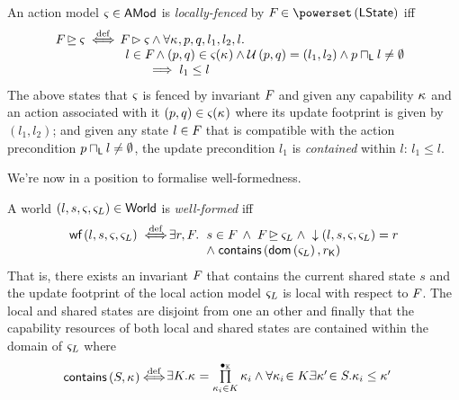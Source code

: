\begin{definition}
An action model $\varsigma_{} \in \textsf{AMod}$ is \emph{locally-fenced} by $\fence{} \in \pset{\LStates}$ iff
%
\[
\hspace*{-0.2cm}
\begin{array}{l l}
	\fence{} \strictfences \amod{} \iffdef 
	&
		\hspace*{-0.3cm}
		\fence{} \fences \amod{} \land
		\for{\ca{}, p, q, l_1, l_2, l}\\
	&
		\hspace*{-0.15cm}
		l \in \fence{} \land 
		(p, q) \in \amod{}(\ca{}) \land 
		\updateFP{p, q} = (l_1, l_2) \land 
		p \meetL l \not= \emptyset\\
	&
		\hspace*{0.5cm}
		\implies
		l_1 \leq l
\end{array}
\]
%
The above states that $\varsigma_{}$ is fenced by invariant $F_{}$ and given any capability $\kappa_{}$ and an action associated with it $(p, q) \in \varsigma_{}(\kappa_{})$ where its update footprint is given by $(l_1, l_2)$; and given any state $l \in F_{}$ that is compatible with the action precondition $p \sqcap_{\textsf{L}} l \not= \emptyset$, the update precondition $l_1$ is \emph{contained} within $l$: $l_1 \leq l$. 
\end{definition}
%
%
We're now in a position to formalise well-formedness.
%
\begin{definition}
A world $(l, s, \varsigma_{}, \varsigma_{L}) \in \textsf{World}$ is \emph{well-formed} iff
%
\[
\begin{array}{l l l}
	\wf{l, s, \amod{}, \amod{L}} \iffdef 
	\hspace*{-0.2cm} & \hspace*{-0.2cm}
	\exsts{r, \fence{}} 
	\hspace*{-0.1cm} & \hspace*{-0.1cm} 
		s \in \fence{} \;\land\; 
		\fence{} \strictfences \amod{L} \;\land\;
		\collapseW{l, s, \amod{}, \amod{L}} = r\\
	
	\hspace*{-0.2cm} & \hspace*{-0.2cm} 
	& \hspace*{-0.1cm} 	
	\land\; \contains{\dom{\amod{L}}}{\capPart{r}}
\end{array}
\]
%
That is, there exists an invariant $F_{}$ that contains the current shared state $s$ and the update footprint of the local action model $\varsigma_{L}$ is local with respect to $F_{}$. The local and shared states are disjoint from one an other and finally that the capability resources of both local and shared states are contained within the domain of $\varsigma_{L}$ where
%
\[
\hspace*{-0.2cm}
\begin{array}{l l}
	\contains{S}{\ca{}}\!\! \iffdef & \hspace*{-0.6cm}
	\begin{array}{l}
		\exsts{K}\! \ca{} = \prod\limits_{\ca{i} \in K}^{\composeCap} \ca{i} \land
		\for{\ca{i} \!\in K}\!\! \exsts{\ca{}' \!\in S}\! \ca{i} \leq \ca{}'
	\end{array}
\end{array}
\]
%
\end{definition}
%
%
